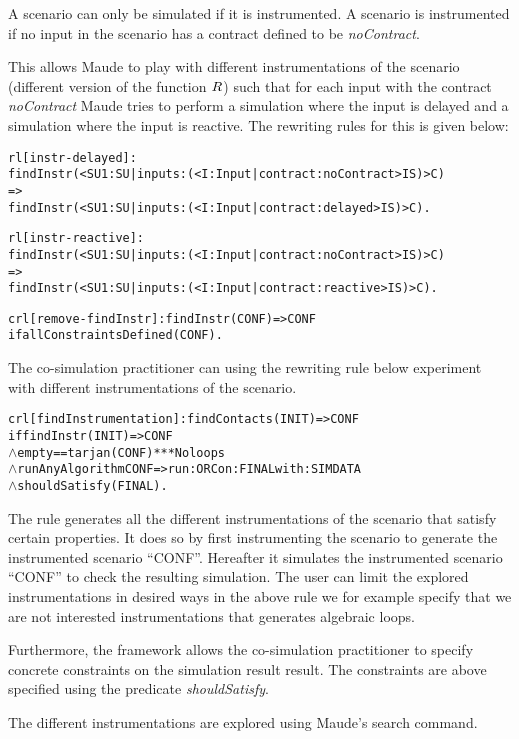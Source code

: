 A scenario can only be simulated if it is instrumented.
A scenario is instrumented if no input in the scenario has a contract defined to be \textit{noContract}.


This allows Maude to play with different instrumentations of the scenario (different version of the function $R$) such that for each input with the contract \textit{noContract} Maude tries to perform a simulation where the input is delayed and a simulation where the input is reactive.
The rewriting rules for this is given below:
\begin{alltt}
  \small
rl [instr-delayed]: 
findInstr(< SU1 : SU | inputs : (< I : Input | contract : noContract > IS) > C)
=>
findInstr(< SU1 : SU | inputs : (< I : Input | contract : delayed > IS) > C) .

rl [instr-reactive]: 
findInstr(< SU1 : SU | inputs : (< I : Input | contract : noContract > IS) > C)
=>
findInstr(< SU1 : SU | inputs : (< I : Input | contract : reactive > IS) > C) .

crl [remove-findInstr]: findInstr(CONF) => CONF 
  if allConstraintsDefined(CONF) .
\end{alltt}

The co-simulation practitioner can using the rewriting rule below experiment with different instrumentations of the scenario.

\begin{alltt}
  \small
  crl [findInstrumentation]: findContacts(INIT) => CONF
      if findInstr(INIT) => CONF
      \(\land\) empty == tarjan(CONF) *** No loops
      \(\land\) runAnyAlgorithm CONF => run: ORC on: FINAL with: SIMDATA
      \(\land\) shouldSatisfy(FINAL) .
  \end{alltt}

The rule generates all the different instrumentations of the scenario that satisfy certain properties.
It does so by first instrumenting the scenario to generate the instrumented scenario ``CONF''.
Hereafter it simulates the instrumented scenario ``CONF'' to check the resulting simulation.
The user can limit the explored instrumentations in desired ways in the above rule we for example specify that we are not interested instrumentations that generates algebraic loops.

Furthermore, the framework allows the co-simulation practitioner to specify concrete constraints on the simulation result result.
The constraints are above specified using the predicate \emph{shouldSatisfy}.

The different instrumentations are explored using Maude's search command.

